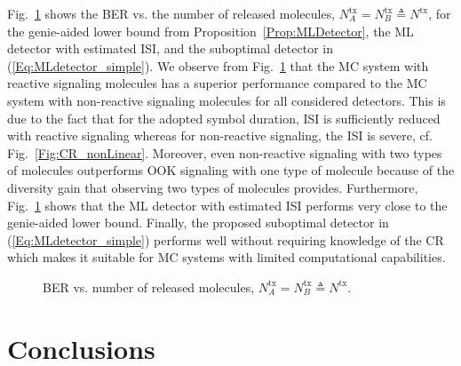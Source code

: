 \documentclass[conference]{IEEEtran}
\begin{document}
Fig.~\ref{Fig:BER} shows the BER vs. the number of released molecules, $N^{\mathrm{tx}}_A = N^{\mathrm{tx}}_B\triangleq N^{\mathrm{tx}}$, for the genie-aided lower bound from Proposition~\ref{Prop:MLDetector}, the ML detector with estimated ISI, and the suboptimal detector in (\ref{Eq:MLdetector_simple}). We observe from Fig.~\ref{Fig:BER} that the MC system with reactive signaling molecules has a superior performance compared to the MC system with non-reactive signaling molecules for all considered detectors.  This is due to the fact that  for the adopted symbol duration, ISI is sufficiently reduced with reactive signaling whereas for non-reactive signaling, the ISI is severe, cf. Fig.~\ref{Fig:CR_nonLinear}. Moreover, even non-reactive signaling with two types of molecules outperforms OOK signaling with one type of molecule because of  the  diversity gain that observing two types of molecules provides. Furthermore, Fig.~\ref{Fig:BER} shows that the ML detector with estimated ISI  performs very close to the genie-aided lower bound. Finally, the proposed suboptimal detector in (\ref{Eq:MLdetector_simple}) performs well without requiring knowledge of the CR which makes it suitable for MC systems with limited computational capabilities.

\begin{figure} 
  \centering\vspace{-0.1cm}
\hspace{-0.6cm}
 \vspace{-0.4cm}
\caption{BER vs. number of released molecules, $N^{\mathrm{tx}}_A = N^{\mathrm{tx}}_B\triangleq N^{\mathrm{tx}}$. \vspace{-0.5cm} }
\label{Fig:BER}
\end{figure}



\section{Conclusions}\label{Sec:Conclusions}
\end{document}
